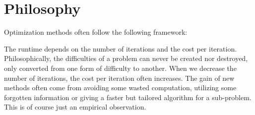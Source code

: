 
\section{Philosophy}

Optimization methods often follow the following framework:

\begin{algorithm2e}[H]

\caption{$\mathtt{OptimizationFramework}$}

\SetAlgoLined


\end{algorithm2e}

The runtime depends on the number of iterations and the cost per iteration.
Philosophically, the difficulties of a problem can never be created
nor destroyed, only converted from one form of difficulty to another.
When we decrease the number of iterations, the cost per iteration
often increases. The gain of new methods often come from avoiding
some wasted computation, utilizing some forgotten information or giving
a faster but tailored algorithm for a sub-problem. This is of course
just an empirical observation.

